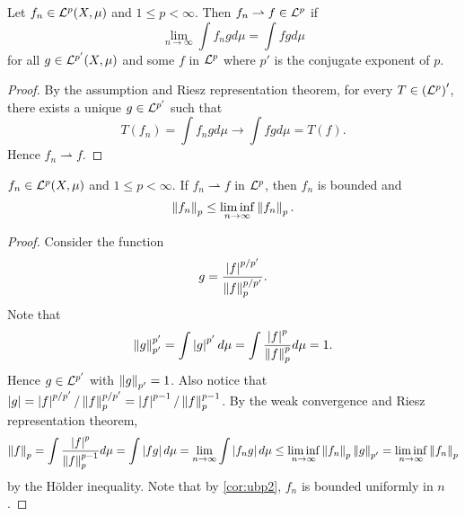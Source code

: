\begin{proposition}
    Let $f_n\in\mathcal{L}^p(X,\mu)$ and $1\leq p<\infty$. Then $f_n\rightharpoonup f\in\mathcal{L}^p$ if 
    \begin{equation*}
        \lim_{n\to\infty} \int f_ngd\mu = \int fgd\mu
    \end{equation*}
    for all $g\in\mathcal{L}^{p'}(X,\mu)$ and some $f$ in $\mathcal{L}^p$ where $p'$ is the 
    conjugate exponent of $p$.
\end{proposition}
\begin{proof}
    By the assumption and Riesz representation theorem, for every 
    $T\in\pth{\L^p}'$, there exists a unique $g\in\mathcal{L}^{p'}$ such that 
    \begin{equation*}
        T(f_n) = \int f_ngd\mu \to \int fgd\mu = T(f).
    \end{equation*}
    Hence $f_n\rightharpoonup f$.
\end{proof}

\begin{proposition}\label{prop:weak_conv_bd}
    $f_n\in\mathcal{L}^p(X,\mu)$ and $1\leq p<\infty$. If $f_n\rightharpoonup f$ in $\mathcal{L}^p$, 
    then $f_n$ is bounded and 
    \begin{equation*}
        \left\lVert {f_n} \right\rVert_p\leq \liminf_{n\to\infty}\left\lVert {f_n} \right\rVert_p.
    \end{equation*}
\end{proposition}
\begin{proof}
    Consider the function 
    \begin{equation*}
        g = \frac{\left\lvert {f} \right\rvert^{p/p'}}{\left\lVert {f} \right\rVert_p^{p/p'}}.
    \end{equation*}
    Note that 
    \begin{equation*}
        \left\lVert {g} \right\rVert_{p'}^{p'} = \int \left\lvert {g} \right\rvert^{p'}d\mu 
        = \int \frac{\left\lvert {f} \right\rvert^p}{\left\lVert {f} \right\rVert_p^p}d\mu = 1.
    \end{equation*}
    Hence $g\in\mathcal{L}^{p'}$ with $\left\lVert {g} \right\rVert_{p'} = 1$. Also notice 
    that $\left\lvert {g} \right\rvert = \left\lvert {f} \right\rvert^{p/p'}/\left\lVert {f} \right\rVert_p^{p/p'} 
    = \left\lvert {f} \right\rvert^{p-1}/\left\lVert {f} \right\rVert_p^{p-1}$. By the weak convergence 
    and Riesz representation theorem, 
    \begin{equation*}
        \begin{split}
            \left\lVert {f} \right\rVert_p = \int \frac{\left\lvert {f} \right\rvert^p}{\left\lVert {f} \right\rVert_p^{p-1}}d\mu 
            = \int \left\lvert {fg} \right\rvert d\mu = \lim_{n\to\infty}\int \left\lvert {f_ng} \right\rvert d\mu
            \leq \liminf_{n\to\infty}\left\lVert {f_n} \right\rVert_p\left\lVert {g} \right\rVert_{p'} 
            = \liminf_{n\to\infty}\left\lVert {f_n} \right\rVert_p
        \end{split}
    \end{equation*}
    by the H\"older inequality. Note that by \cref{cor:ubp2}, $f_n$ 
    is bounded uniformly in $n$.
\end{proof}

